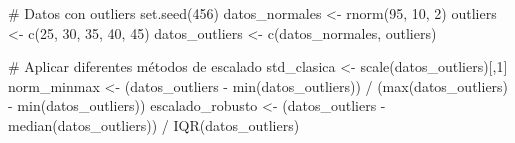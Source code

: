 \documentclass[
  letterpaper,
  DIV=11,
  numbers=noendperiod]{scrreprt}
\newenvironment{Shaded}{\begin{snugshade}}{\end{snugshade}}
\newcommand{\CommentTok}[1]{\textcolor[rgb]{0.37,0.37,0.37}{#1}}
\newcommand{\DecValTok}[1]{\textcolor[rgb]{0.68,0.00,0.00}{#1}}
\newcommand{\FunctionTok}[1]{\textcolor[rgb]{0.28,0.35,0.67}{#1}}
\newcommand{\NormalTok}[1]{\textcolor[rgb]{0.00,0.23,0.31}{#1}}
\newcommand{\OtherTok}[1]{\textcolor[rgb]{0.00,0.23,0.31}{#1}}
\newcommand{\SpecialCharTok}[1]{\textcolor[rgb]{0.37,0.37,0.37}{#1}}
\begin{document}
\begin{tcolorbox}[enhanced jigsaw, breakable, toprule=.15mm, bottomtitle=1mm, coltitle=black, colbacktitle=quarto-callout-tip-color!10!white, titlerule=0mm, opacitybacktitle=0.6, bottomrule=.15mm, toptitle=1mm, title=\textcolor{quarto-callout-tip-color}{\faLightbulb}\hspace{0.5em}{Ejemplo con outliers: Escalado robusto}, arc=.35mm, rightrule=.15mm, opacityback=0, colframe=quarto-callout-tip-color-frame, leftrule=.75mm, left=2mm, colback=white]

\begin{Shaded}
\begin{Highlighting}[]
\CommentTok{\# Datos con outliers}
\FunctionTok{set.seed}\NormalTok{(}\DecValTok{456}\NormalTok{)}
\NormalTok{datos\_normales }\OtherTok{\textless{}{-}} \FunctionTok{rnorm}\NormalTok{(}\DecValTok{95}\NormalTok{, }\DecValTok{10}\NormalTok{, }\DecValTok{2}\NormalTok{)}
\NormalTok{outliers }\OtherTok{\textless{}{-}} \FunctionTok{c}\NormalTok{(}\DecValTok{25}\NormalTok{, }\DecValTok{30}\NormalTok{, }\DecValTok{35}\NormalTok{, }\DecValTok{40}\NormalTok{, }\DecValTok{45}\NormalTok{)}
\NormalTok{datos\_outliers }\OtherTok{\textless{}{-}} \FunctionTok{c}\NormalTok{(datos\_normales, outliers)}

\CommentTok{\# Aplicar diferentes métodos de escalado}
\NormalTok{std\_clasica }\OtherTok{\textless{}{-}} \FunctionTok{scale}\NormalTok{(datos\_outliers)[,}\DecValTok{1}\NormalTok{]}
\NormalTok{norm\_minmax }\OtherTok{\textless{}{-}}\NormalTok{ (datos\_outliers }\SpecialCharTok{{-}} \FunctionTok{min}\NormalTok{(datos\_outliers)) }\SpecialCharTok{/}\NormalTok{ (}\FunctionTok{max}\NormalTok{(datos\_outliers) }\SpecialCharTok{{-}} \FunctionTok{min}\NormalTok{(datos\_outliers))}
\NormalTok{escalado\_robusto }\OtherTok{\textless{}{-}}\NormalTok{ (datos\_outliers }\SpecialCharTok{{-}} \FunctionTok{median}\NormalTok{(datos\_outliers)) }\SpecialCharTok{/} \FunctionTok{IQR}\NormalTok{(datos\_outliers)}


\end{Highlighting}
\end{Shaded}
\end{tcolorbox}
\end{document}
